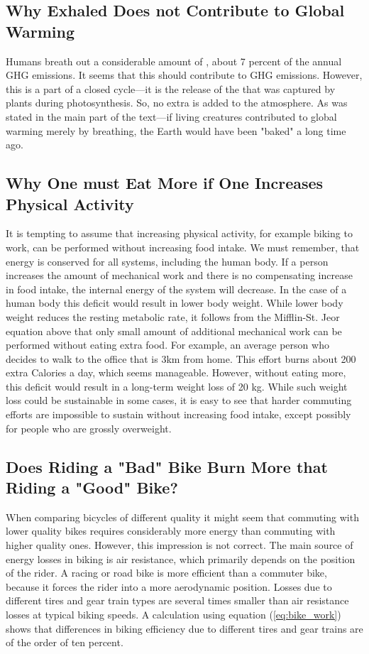 \documentclass{article}[12pt,letterpaper]
\begin{document}
\subsection{Why Exhaled \cadi Does not Contribute to Global Warming}
Humans breath out a considerable amount of \cadi, about 7 percent of the annual GHG emissions. It seems that this \cadi should contribute to GHG emissions. However, this \cadi is a part of a closed cycle---it is the release of the \cadi that was captured by plants during photosynthesis. So, no extra \cadi is added to the atmosphere. As was stated in the main part of the text---if living creatures contributed to global warming merely by breathing, the Earth would have been "baked" a long time ago.
\subsection{Why One must Eat More if One Increases Physical Activity}
It is tempting to assume that increasing physical activity, for example biking to work, can be performed without increasing food intake. We must remember, that energy is conserved for all systems, including the human body. If a person increases the amount of mechanical work and there is no compensating increase in food intake, the internal energy of the system will decrease. In the case of a human body this deficit would result in lower body weight. While lower body weight reduces the resting metabolic rate, it follows from the Mifflin-St. Jeor equation above that only small amount of additional mechanical work can be performed without eating extra food. For example, an average person who decides to walk to the office that is 3km from home. This effort burns about 200 extra Calories a day, which seems manageable. However, without eating more, this deficit would result in a long-term weight loss of 20 kg. While such weight loss could be sustainable in some cases, it is easy to see that harder commuting efforts are impossible to sustain without increasing food intake, except possibly for people who are grossly overweight.
\subsection{Does Riding a "Bad" Bike Burn More that Riding a "Good" Bike?}
When comparing bicycles of different quality it might seem that commuting with lower quality bikes requires considerably more energy than commuting with higher quality ones. However, this impression is not correct. The main source of energy losses in biking is air resistance, which primarily depends on the position of the rider. A racing or road bike is more efficient than a commuter bike, because it forces the rider into a more aerodynamic position. Losses due to different tires and gear train types are several times smaller than air resistance losses at typical biking speeds. A calculation using equation (\ref{eq:bike_work}) shows that differences in biking efficiency due to different tires and gear trains are of the order of ten percent.
\end{document}
